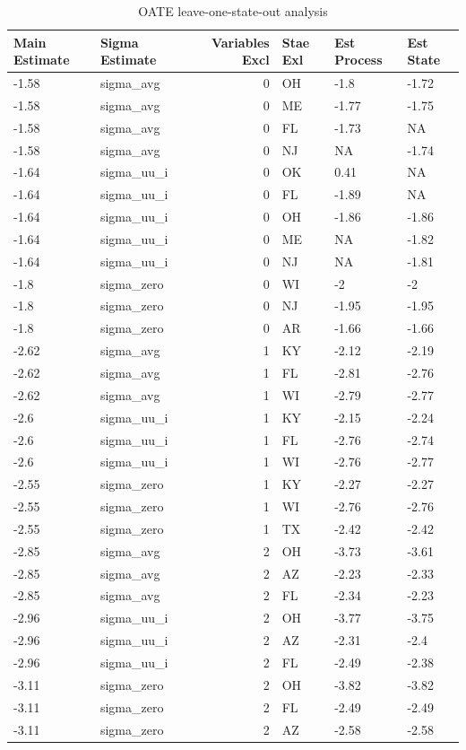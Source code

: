 \documentclass[12pt]{article}
\begin{document}
\begin{table}[ht]
\centering
\begin{tabular}{llrlll}
  \hline
Main Estimate & Sigma Estimate & Variables Excl & Stae Exl & Est Process & Est State \\ 
  \hline
-1.58 & sigma\_avg & 0 & OH & -1.8 & -1.72 \\ 
  -1.58 & sigma\_avg & 0 & ME & -1.77 & -1.75 \\ 
  -1.58 & sigma\_avg & 0 & FL & -1.73 & NA \\ 
  -1.58 & sigma\_avg & 0 & NJ & NA & -1.74 \\ 
  -1.64 & sigma\_uu\_i & 0 & OK & 0.41 & NA \\ 
  -1.64 & sigma\_uu\_i & 0 & FL & -1.89 & NA \\ 
  -1.64 & sigma\_uu\_i & 0 & OH & -1.86 & -1.86 \\ 
  -1.64 & sigma\_uu\_i & 0 & ME & NA & -1.82 \\ 
  -1.64 & sigma\_uu\_i & 0 & NJ & NA & -1.81 \\ 
  -1.8 & sigma\_zero & 0 & WI & -2 & -2 \\ 
  -1.8 & sigma\_zero & 0 & NJ & -1.95 & -1.95 \\ 
  -1.8 & sigma\_zero & 0 & AR & -1.66 & -1.66 \\ 
  -2.62 & sigma\_avg & 1 & KY & -2.12 & -2.19 \\ 
  -2.62 & sigma\_avg & 1 & FL & -2.81 & -2.76 \\ 
  -2.62 & sigma\_avg & 1 & WI & -2.79 & -2.77 \\ 
  -2.6 & sigma\_uu\_i & 1 & KY & -2.15 & -2.24 \\ 
  -2.6 & sigma\_uu\_i & 1 & FL & -2.76 & -2.74 \\ 
  -2.6 & sigma\_uu\_i & 1 & WI & -2.76 & -2.77 \\ 
  -2.55 & sigma\_zero & 1 & KY & -2.27 & -2.27 \\ 
  -2.55 & sigma\_zero & 1 & WI & -2.76 & -2.76 \\ 
  -2.55 & sigma\_zero & 1 & TX & -2.42 & -2.42 \\ 
  -2.85 & sigma\_avg & 2 & OH & -3.73 & -3.61 \\ 
  -2.85 & sigma\_avg & 2 & AZ & -2.23 & -2.33 \\ 
  -2.85 & sigma\_avg & 2 & FL & -2.34 & -2.23 \\ 
  -2.96 & sigma\_uu\_i & 2 & OH & -3.77 & -3.75 \\ 
  -2.96 & sigma\_uu\_i & 2 & AZ & -2.31 & -2.4 \\ 
  -2.96 & sigma\_uu\_i & 2 & FL & -2.49 & -2.38 \\ 
  -3.11 & sigma\_zero & 2 & OH & -3.82 & -3.82 \\ 
  -3.11 & sigma\_zero & 2 & FL & -2.49 & -2.49 \\ 
  -3.11 & sigma\_zero & 2 & AZ & -2.58 & -2.58 \\ 
   \hline
\end{tabular}
\caption{OATE leave-one-state-out analysis}
\label{oateloostate}
\end{table}
\end{document}
